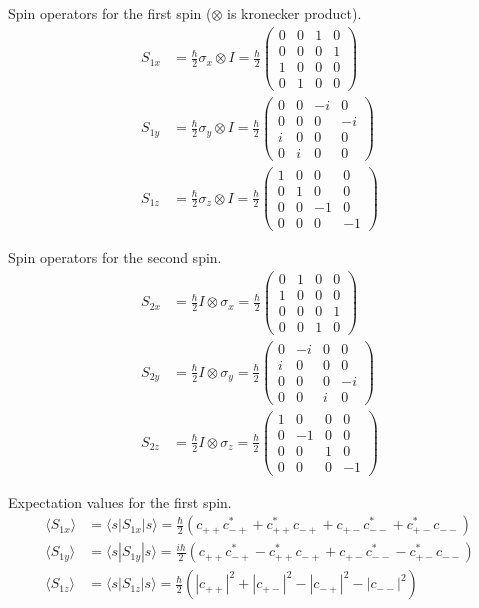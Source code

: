 Spin operators for the first spin
($\otimes$ is kronecker product).
\begin{align*}
S_{1x}&=\frac{\hbar}{2}\sigma_x\otimes I=\frac{\hbar}{2}
\begin{pmatrix}
0&0&1&0\\
0&0&0&1\\
1&0&0&0\\
0&1&0&0
\end{pmatrix}
\\
S_{1y}&=\frac{\hbar}{2}\sigma_y\otimes I=\frac{\hbar}{2}
\begin{pmatrix}
0&0&-i&0\\
0&0&0&-i\\
i&0&0&0\\
0&i&0&0
\end{pmatrix}
\\
S_{1z}&=\frac{\hbar}{2}\sigma_z\otimes I=\frac{\hbar}{2}
\begin{pmatrix}
1&0&0&0\\
0&1&0&0\\
0&0&-1&0\\
0&0&0&-1
\end{pmatrix}
\end{align*}

Spin operators for the second spin.
\begin{align*}
S_{2x}&=\frac{\hbar}{2}I\otimes\sigma_x=\frac{\hbar}{2}
\begin{pmatrix}
0&1&0&0\\
1&0&0&0\\
0&0&0&1\\
0&0&1&0
\end{pmatrix}
\\
S_{2y}&=\frac{\hbar}{2}I\otimes\sigma_y=\frac{\hbar}{2}
\begin{pmatrix}
0&-i&0&0\\
i&0&0&0\\
0&0&0&-i\\
0&0&i&0
\end{pmatrix}
\\
S_{2z}&=\frac{\hbar}{2}I\otimes\sigma_z=\frac{\hbar}{2}
\begin{pmatrix}
1&0&0&0\\
0&-1&0&0\\
0&0&1&0\\
0&0&0&-1
\end{pmatrix}
\end{align*}

Expectation values for the first spin.
\begin{align*}
\langle S_{1x}\rangle&=\langle s|S_{1x}|s\rangle
=\frac{\hbar}{2}
\left(c_{++}c_{-+}^*+c_{++}^*c_{-+}+c_{+-}c_{--}^*+c_{+-}^*c_{--}\right)
\\
\langle S_{1y}\rangle&=\langle s|S_{1y}|s\rangle
=\frac{i\hbar}{2}
\left(c_{++}c_{-+}^*-c_{++}^*c_{-+}+c_{+-}c_{--}^*-c_{+-}^*c_{--}\right)
\\
\langle S_{1z}\rangle&=\langle s|S_{1z}|s\rangle
=\frac{\hbar}{2}
\left(|c_{++}|^2+|c_{+-}|^2-|c_{-+}|^2-|c_{--}|^2\right)
\end{align*}

